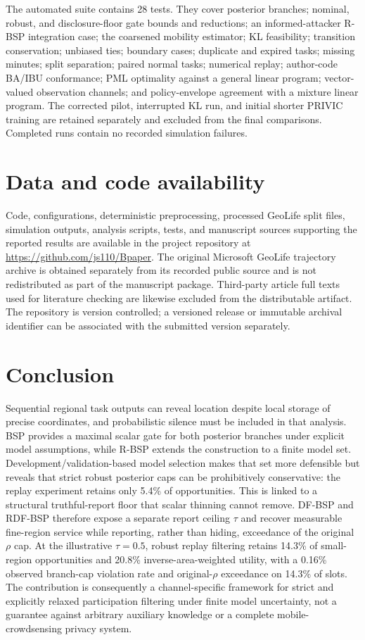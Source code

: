 \documentclass[review,11pt,times]{elsarticle}
\begin{document}
The automated suite contains 28 tests. They cover posterior branches; nominal, robust, and disclosure-floor gate bounds and reductions; an informed-attacker R-BSP integration case; the coarsened mobility estimator; KL feasibility; transition conservation; unbiased ties; boundary cases; duplicate and expired tasks; missing minutes; split separation; paired normal tasks; numerical replay; author-code BA/IBU conformance; PML optimality against a general linear program; vector-valued observation channels; and policy-envelope agreement with a mixture linear program. The corrected pilot, interrupted KL run, and initial shorter PRIVIC training are retained separately and excluded from the final comparisons. Completed runs contain no recorded simulation failures.

\section*{Data and code availability}
Code, configurations, deterministic preprocessing, processed GeoLife split files, simulation outputs, analysis scripts, tests, and manuscript sources supporting the reported results are available in the project repository at \url{https://github.com/js110/Bpaper}. The original Microsoft GeoLife trajectory archive is obtained separately from its recorded public source and is not redistributed as part of the manuscript package. Third-party article full texts used for literature checking are likewise excluded from the distributable artifact. The repository is version controlled; a versioned release or immutable archival identifier can be associated with the submitted version separately.

\section{Conclusion}
Sequential regional task outputs can reveal location despite local storage of precise coordinates, and probabilistic silence must be included in that analysis. BSP provides a maximal scalar gate for both posterior branches under explicit model assumptions, while R-BSP extends the construction to a finite model set. Development/validation-based model selection makes that set more defensible but reveals that strict robust posterior caps can be prohibitively conservative: the replay experiment retains only 5.4\% of opportunities. This is linked to a structural truthful-report floor that scalar thinning cannot remove. DF-BSP and RDF-BSP therefore expose a separate report ceiling $\tau$ and recover measurable fine-region service while reporting, rather than hiding, exceedance of the original $\rho$ cap. At the illustrative $\tau=0.5$, robust replay filtering retains 14.3\% of small-region opportunities and 20.8\% inverse-area-weighted utility, with a 0.16\% observed branch-cap violation rate and original-$\rho$ exceedance on 14.3\% of slots. The contribution is consequently a channel-specific framework for strict and explicitly relaxed participation filtering under finite model uncertainty, not a guarantee against arbitrary auxiliary knowledge or a complete mobile-crowdsensing privacy system.
\end{document}
